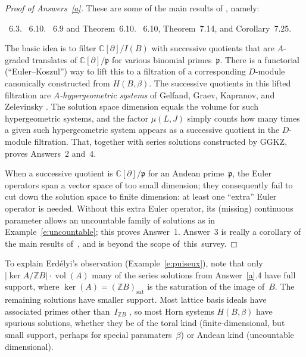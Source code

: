 \documentclass[12pt]{amsart}
\numberwithin{equation}{section}
\theoremstyle{definition}
\begin{document}
\begin{proof}[Proof of Answers~\ref{a}]
These are some of the main results of \cite{dmm}, namely:
\begin{enumerate}
\itemTheorem~6.3.
\itemTheorem~6.10.
\itemDefinition~6.9 and Theorem~6.10.
\itemTheorem~6.10, Theorem~7.14, and Corollary~7.25.
\end{enumerate}
The basic idea is to filter ${\mathbb{C}}[{\partial}]/I(B)$ with successive quotients
that are $A$-graded translates of ${\mathbb{C}}[{\partial}]/{\mathfrak{p}}$ for various binomial
primes~${\mathfrak{p}}$.  There is a functorial (``Euler--Koszul'') way to lift
this to a filtration of a corresponding $D$-module canonically
constructed from $H(B,\beta)$.  The successive quotients in this
lifted filtration are \emph{$A$-hypergeometric systems} of Gelfand,
Graev, Kapranov, and Zelevinsky \cite{ggz,gkz}.  The solution space
dimension equals the volume for such hypergeometric systems, and the
factor $\mu(L,J)$ simply counts how many times a given such
hypergeometric system appears as a successive quotient in the
$D$-module filtration.  That, together with series solutions
constructed by GGKZ, proves Answers~2 and~4.

When a successive quotient is ${\mathbb{C}}[{\partial}]/{\mathfrak{p}}$ for an Andean
prime~${\mathfrak{p}}$, the Euler operators span a vector space of too small
dimension; they consequently fail to cut down the solution space to
finite dimension: at least one ``extra'' Euler operator is needed.
Without this extra Euler operator, its (missing) continuous parameter
allows an uncountable family of solutions as in
Example~\ref{e:uncountable}; this proves Answer~1.  Answer~3 is really
a corollary of the main results of~\cite{mmw}, and is beyond the scope
of~this~survey.
\end{proof}

To explain Erd\'elyi's observation (Example~\ref{e:puiseux}), note
that only $|\ker A/{\mathbb{Z}} B| \cdot \operatorname{vol}(A)$ many of the series solutions
from Answer~\ref{a}.4 have full support, where $\ker(A) = ({\mathbb{Z}}
B)_{\mathrm{sat}}$ is the saturation of the image of~$B$.  The remaining
solutions have smaller support.  Most lattice basis ideals have
associated primes other than~$I_{{\mathbb{Z}} B}$ \cite{hosten-shapiro}, so
most Horn systems $H(B,\beta)$ have spurious solutions, whether they
be of the toral kind (finite-dimensional, but small support, perhaps
for special paramaters~$\beta$) or Andean kind (uncountable
dimensional).
\end{document}
